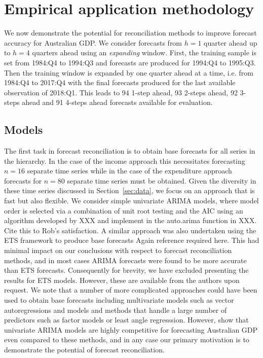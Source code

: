 \documentclass[graybox]{svmult}
\begin{document}
\section{Empirical application methodology}\label{sec:meth}

We now demonstrate the potential for reconciliation methods to improve forecast accuracy for Australian GDP.  We consider forecasts from $h=1$ quarter ahead up to $h=4$ quarters ahead using an {\em expanding} window.  First, the training sample is set from 1984:Q4 to 1994:Q3 and forecasts are produced for 1994:Q4 to 1995:Q3. Then the training window is expanded by one quarter ahead at a time, i.e. from 1984:Q4 to 2017:Q4 with the final forecasts produced for the last available observation of 2018:Q1. This leads to 94 1-step ahead, 93 2-steps ahead, 92 3-steps ahead and 91 4-steps ahead forecasts available for evaluation.


\subsection{Models}


The first task in forecast reconciliation is to obtain base forecasts for all series in the hierarchy.  In the case of the income approach this necessitates forecasting $n=16$ separate time series while in the case of the expenditure approach forecasts for $n=80$ separate time series must be obtained.  Given the diversity in these time series discussed in Section~\ref{sec:data}, we focus on an approach that is fast but also flexible.  We consider simple univariate ARIMA models, where model order is selected via a combination of unit root testing and the AIC using an algorithm developed by XXX and implement in the auto.arima function in XXX. {\color{red} Cite this to Rob's satisfaction}.  A similar approach was also undertaken using the ETS framework to produce base forecasts {\color{red} Again reference required here}.  This had minimal impact on our conclusions with respect to forecast reconciliation methods, and in most cases ARIMA forecasts were found to be more accurate than ETS forecasts.  {\color{orange} Consequently for brevity, we have excluded presenting the results for ETS models. However, these are available from the authors upon request}.  We note that a number of more complicated approaches could have been used to obtain base forecasts including multivariate models such as vector autoregressions and models and methods that handle a large number of predictors such as factor models or least angle regresssion. However, \cite{PanEtAl2019} show that univariate ARIMA models are highly competitive for forecasting Australian GDP even compared to these methods, and in any case our primary motivation is to demonstrate the potential of forecast reconciliation.
\end{document}
